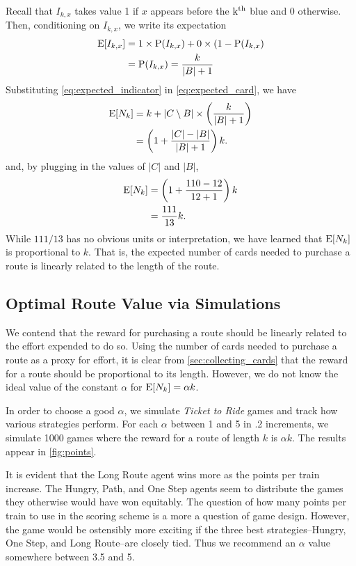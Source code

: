 Recall that $I_{k,x}$ takes value 1 if $x$ appears before the 
$\operatorname{k^{th}}$ blue and 0 otherwise.
Then, conditioning on $I_{k,x}$, we write its expectation
\begin{align} \label{eq:expected_indicator}
    \operatorname{\mathrm{E}}[I_{k,x}] &= 1 \times \operatorname{\mathrm{P}}(I_{k,x})
    + 0 \times (1-\operatorname{\mathrm{P}}(I_{k,x}) \nonumber \\
    &=\operatorname{\mathrm{P}}(I_{k,x}) = \frac{k}{|B| + 1}
\end{align}
Substituting \cref{eq:expected_indicator} in \cref{eq:expected_card},
we have
\begin{align}
    \operatorname{\mathrm{E}}[N_k] &= k + |C \setminus B| \times \left(\frac{k}{|B| + 1}\right)
    \nonumber \\
    &= \left(1 + \frac{|C| - |B|}{|B| + 1} \right)k. \nonumber
\end{align}
and, by plugging in the values of $|C|$ and $|B|$,
\begin{align}
    \operatorname{\mathrm{E}}[N_k] &= \left(1 + \frac{110 - 12}{12 + 1} \right)k \nonumber \\
    &= \frac{111}{13}k. \nonumber
\end{align}
While  $111/13$ has no obvious units or interpretation,
we have learned that $\operatorname{\mathrm{E}}[N_k]$ is proportional to $k$.
That is, the expected number of cards needed to
purchase a route is linearly related to the length of the route.

\subsection{Optimal Route Value via Simulations}
We contend that the reward for purchasing a route 
should be linearly related to the effort expended to do so.
Using the number of cards needed to purchase a route 
as a proxy for effort, it is clear from \cref{sec:collecting_cards}
that the reward for a route should be proportional to
its length.
However, we do not know the ideal value of the constant $\alpha$
for $\operatorname{\mathrm{E}}[N_k] = \alpha k$.

In order to choose a good $\alpha$, we simulate 
\textit{Ticket to Ride} games and track how various
strategies perform.
For each $\alpha$ between 1 and 5 in .2 increments,
we simulate 1000 games where the reward for a route
of length $k$ is $\alpha k$.
The results appear in \cref{fig:points}.

It is evident that the Long Route agent
wins more as the points per train increase.
The Hungry, Path, and One Step agents seem
to distribute the games they otherwise
would have won equitably.
The question of how many points per train
to use in the scoring scheme is a more a question
of game design.
However, the game would be ostensibly more exciting if the
three best strategies--Hungry, One Step,
and Long Route--are closely tied.
Thus we recommend an $\alpha$ value somewhere
between 3.5 and 5.

